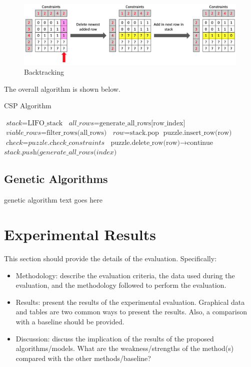 \documentclass{svproc}
\begin{document}
\begin{figure}[h]
    \centering
    \includegraphics[scale=0.36]{Backtracking.png}
    \caption{Backtracking}
    \label{fig:Backtrack}
\end{figure}

The overall algorithm is shown below.

\begin{algorithm}
    \caption{CSP Algorithm}\label{euclid}
    \begin{algorithmic}[1]
        \State $\textit{stack} = \text{LIFO\_stack}$
        \State $\textit{all\_rows} = \text{generate\_all\_rows[row\_index]}$
        \State $\textit{viable\_rows} = \text{filter\_rows(all\_rows)}$
        \State $\textit{row} = \text{stack.pop}$
        \State $\text{puzzle.insert\_row(row)}$
        \State $\textit{check} = \textit{puzzle.check\_constraints}$
        \State $\text{puzzle.delete\_row(row)} \to \text{continue}$
        \EndIf
        \State $\textit{stack.push(generate\_all\_rows(index)}$
        \EndWhile
        \EndWhile
    \end{algorithmic}
\end{algorithm}

\subsection{Genetic Algorithms}
genetic algorithm text goes here

\section{Experimental Results}
	This section should provide the details of the evaluation. Specifically:
\begin{itemize}
	\item Methodology: describe the evaluation criteria, the data used during the evaluation, and the methodology followed to perform the evaluation.
	\item Results: present the results of the experimental evaluation. Graphical data and tables are two common ways to present the results. Also, a comparison with a baseline should be provided.
	\item Discussion: discuss the implication of the results of the proposed algorithms/models. What are the weakness/strengths of the method(s) compared with the other methods/baseline?
\end{itemize}
\end{document}
